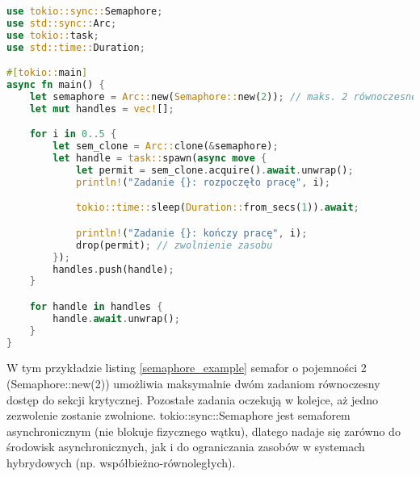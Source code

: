 \begin{lstlisting}[language=Rust, caption=Przykład użycia semafora, label=semaphore_example]
use tokio::sync::Semaphore;
use std::sync::Arc;
use tokio::task;
use std::time::Duration;

#[tokio::main]
async fn main() {
    let semaphore = Arc::new(Semaphore::new(2)); // maks. 2 równoczesne zasoby
    let mut handles = vec![];

    for i in 0..5 {
        let sem_clone = Arc::clone(&semaphore);
        let handle = task::spawn(async move {
            let permit = sem_clone.acquire().await.unwrap();
            println!("Zadanie {}: rozpoczęło pracę", i);

            tokio::time::sleep(Duration::from_secs(1)).await;

            println!("Zadanie {}: kończy pracę", i);
            drop(permit); // zwolnienie zasobu
        });
        handles.push(handle);
    }

    for handle in handles {
        handle.await.unwrap();
    }
}
\end{lstlisting}
W tym przykładzie listing \ref{semaphore_example} semafor o pojemności 2 (Semaphore::new(2)) umożliwia maksymalnie dwóm zadaniom równoczesny dostęp do sekcji krytycznej. Pozostałe zadania oczekują w kolejce, aż jedno zezwolenie zostanie zwolnione. tokio::sync::Semaphore jest semaforem asynchronicznym (nie blokuje fizycznego wątku), dlatego nadaje się zarówno do środowisk asynchronicznych, jak i do ograniczania zasobów w systemach hybrydowych (np. współbieżno-równoległych).